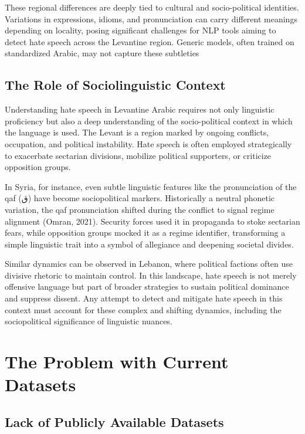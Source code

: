 \documentclass[11pt]{article}
\begin{document}
These regional differences are deeply tied to cultural and socio-political identities. Variations in expressions, idioms, and pronunciation can carry different meanings depending on locality, posing significant challenges for NLP tools aiming to detect hate speech across the Levantine region. Generic models, often trained on standardized Arabic, may not capture these subtleties


\subsection{The Role of Sociolinguistic Context}

Understanding hate speech in Levantine Arabic requires not only linguistic proficiency but also a deep understanding of the socio-political context in which the language is used. The Levant is a region marked by ongoing conflicts, occupation, and political instability. Hate speech is often employed strategically to exacerbate sectarian divisions, mobilize political supporters, or criticize opposition groups.

In Syria, for instance, even subtle linguistic features like the pronunciation of the qaf (ق) have become sociopolitical markers. Historically a neutral phonetic variation, the qaf pronunciation shifted during the conflict to signal regime alignment (Omran, 2021). Security forces used it in propaganda to stoke sectarian fears, while opposition groups mocked it as a regime identifier, transforming a simple linguistic trait into a symbol of allegiance and deepening societal divides.

Similar dynamics can be observed in Lebanon, where political factions often use divisive rhetoric to maintain control. In this landscape, hate speech is not merely offensive language but part of broader strategies to sustain political dominance and suppress dissent. Any attempt to detect and mitigate hate speech in this context must account for these complex and shifting dynamics, including the sociopolitical significance of linguistic nuances.


\section{The Problem with Current Datasets}

\subsection{Lack of Publicly Available Datasets}
\end{document}
